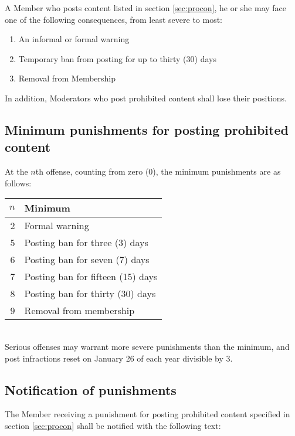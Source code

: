 \documentclass[10pt]{book}
\begin{document}
A Member who posts content listed in section \ref{sec:procon}, he or she may face one of the following consequences, from least severe to most:

\begin{enumerate}
 \item An informal or formal warning
 \item Temporary ban from posting for up to thirty (30) days
 \item Removal from Membership
\end{enumerate}

In addition, Moderators who post prohibited content shall lose their positions.

\subsection{Minimum punishments for posting prohibited content}

At the $n$th offense, counting from zero (0), the minimum punishments are as follows: \\

\begin{tabular}{|r|l|}
 \hline
 $n$ & Minimum \\ \hline
 2 & Formal warning \\
 5 & Posting ban for three (3) days \\
 6 & Posting ban for seven (7) days \\
 7 & Posting ban for fifteen (15) days \\
 8 & Posting ban for thirty (30) days \\
 9 & Removal from membership \\ \hline
\end{tabular} \\

Serious offenses may warrant more severe punishments than the minimum, and post infractions reset on January 26 of each year divisible by 3.

\subsection{Notification of punishments}

The Member receiving a punishment for posting prohibited content specified in section \ref{sec:procon} shall be notified with the following text:

\newcommand{\nintro}{You have posted content in the domain of Touhou Prono prohibited by section \ref{sec:procon} in the version of the Touhou Prono Code effective at the time this message was sent. Therefore, your post may have been edited or deleted and }
\newcommand{\nfinal}{Further violations may be punished more severely per section \ref{sec:postcons}.}
\end{document}
